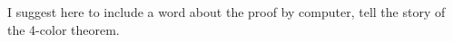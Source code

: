 {\Denis I suggest here to include a word about the proof by computer, tell the story of 
the 4-color theorem.}

%
%
%


